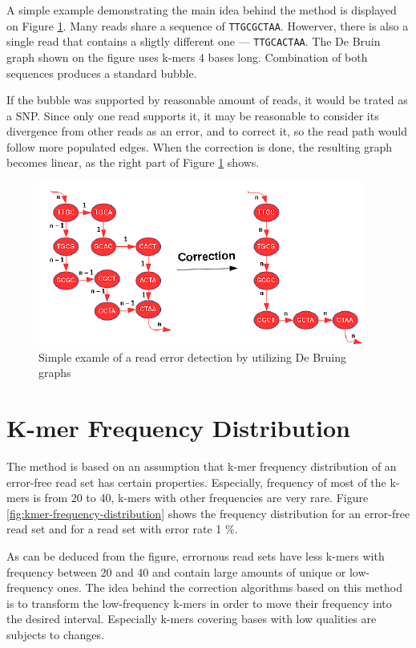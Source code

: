 A simple example demonstrating the main idea behind the method is displayed on Figure \ref{fig:error-correction-db}. Many reads share a sequence of \texttt{TTGCGCTAA}. Howerver, there is also a single read that contains a sligtly different one --- \texttt{TTGCACTAA}. The De Bruin graph shown on the figure uses k-mers 4 bases long. Combination of both sequences produces a standard bubble.

If the bubble was supported by reasonable amount of reads, it would be trated as a SNP. Since only one read supports it, it may be reasonable to consider its divergence from other reads as an error, and to correct it, so the read path would follow more populated edges. When the correction is done, the resulting graph becomes linear, as the right part of Figure \ref{fig:error-correction-db} shows.

\begin{figure}[h]
	\centering
	\includegraphics{img/error-correction-db.pdf}
	\caption{Simple examle of a read error detection by utilizing De Bruing graphs}
	\label{fig:error-correction-db}
\end{figure}

\section{K-mer Frequency Distribution}
\label{sec:ec-kmer-frequency-distribution}

The method is based on an assumption that k-mer frequency distribution of an error-free read set has certain properties. Especially, frequency of most of the k-mers is from 20 to 40, k-mers with other frequencies are very rare. Figure \ref{fig:kmer-frequency-distribution} shows the frequency distribution for an error-free read set and for a read set with error rate 1 \%. 

As can be deduced from the figure, errornous read sets have less k-mers with frequency between 20 and 40 and contain large amounts of unique or low-frequency ones. The idea behind the correction algorithms based on this method is to transform the low-frequency k-mers in order to move their frequency into the desired interval. Especially k-mers covering bases with low qualities are subjects to changes.

